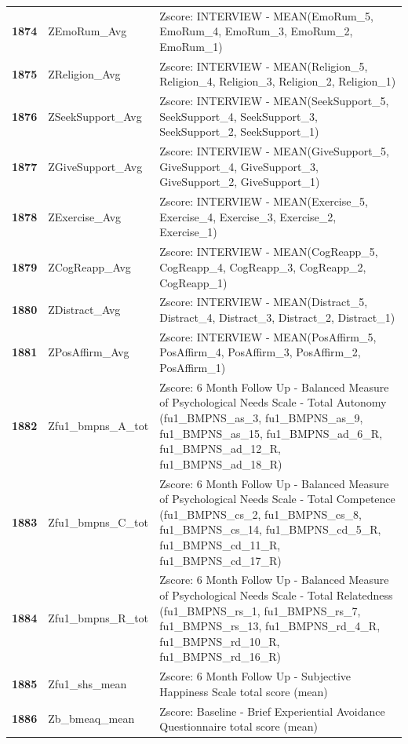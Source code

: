 \documentclass[
  letterpaper,
  DIV=11,
  numbers=noendperiod]{scrartcl}
\begin{document}
\begin{longtable}[t]{>{}cll}
\textbf{1874} & ZEmoRum\_Avg & Zscore:  INTERVIEW - MEAN(EmoRum\_5, EmoRum\_4, EmoRum\_3, EmoRum\_2, EmoRum\_1)\\
\textbf{1875} & ZReligion\_Avg & Zscore:  INTERVIEW - MEAN(Religion\_5, Religion\_4, Religion\_3, Religion\_2, Religion\_1)\\
\addlinespace
\textbf{1876} & ZSeekSupport\_Avg & Zscore:  INTERVIEW - MEAN(SeekSupport\_5, SeekSupport\_4, SeekSupport\_3, SeekSupport\_2, SeekSupport\_1)\\
\textbf{1877} & ZGiveSupport\_Avg & Zscore:  INTERVIEW - MEAN(GiveSupport\_5, GiveSupport\_4, GiveSupport\_3, GiveSupport\_2, GiveSupport\_1)\\
\textbf{1878} & ZExercise\_Avg & Zscore:  INTERVIEW - MEAN(Exercise\_5, Exercise\_4, Exercise\_3, Exercise\_2, Exercise\_1)\\
\textbf{1879} & ZCogReapp\_Avg & Zscore:  INTERVIEW - MEAN(CogReapp\_5, CogReapp\_4, CogReapp\_3, CogReapp\_2, CogReapp\_1)\\
\textbf{1880} & ZDistract\_Avg & Zscore:  INTERVIEW - MEAN(Distract\_5, Distract\_4, Distract\_3, Distract\_2, Distract\_1)\\
\addlinespace
\textbf{1881} & ZPosAffirm\_Avg & Zscore:  INTERVIEW - MEAN(PosAffirm\_5, PosAffirm\_4, PosAffirm\_3, PosAffirm\_2, PosAffirm\_1)\\
\textbf{1882} & Zfu1\_bmpns\_A\_tot & Zscore:  6 Month Follow Up - Balanced Measure of Psychological Needs Scale - Total Autonomy (fu1\_BMPNS\_as\_3, fu1\_BMPNS\_as\_9, fu1\_BMPNS\_as\_15, fu1\_BMPNS\_ad\_6\_R, fu1\_BMPNS\_ad\_12\_R, fu1\_BMPNS\_ad\_18\_R)\\
\textbf{1883} & Zfu1\_bmpns\_C\_tot & Zscore:  6 Month Follow Up - Balanced Measure of Psychological Needs Scale - Total Competence (fu1\_BMPNS\_cs\_2, fu1\_BMPNS\_cs\_8, fu1\_BMPNS\_cs\_14, fu1\_BMPNS\_cd\_5\_R,  fu1\_BMPNS\_cd\_11\_R, fu1\_BMPNS\_cd\_17\_R)\\
\textbf{1884} & Zfu1\_bmpns\_R\_tot & Zscore:  6 Month Follow Up - Balanced Measure of Psychological Needs Scale - Total Relatedness (fu1\_BMPNS\_rs\_1, fu1\_BMPNS\_rs\_7, fu1\_BMPNS\_rs\_13, fu1\_BMPNS\_rd\_4\_R,  fu1\_BMPNS\_rd\_10\_R, fu1\_BMPNS\_rd\_16\_R)\\
\textbf{1885} & Zfu1\_shs\_mean & Zscore:  6 Month Follow Up - Subjective Happiness Scale total score (mean)\\
\addlinespace
\textbf{1886} & Zb\_bmeaq\_mean & Zscore:  Baseline - Brief Experiential Avoidance Questionnaire total score (mean)\\

\end{longtable}
\end{document}
